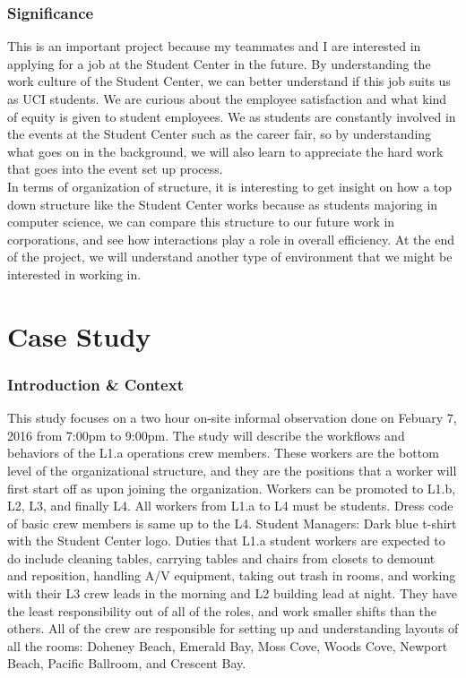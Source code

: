 \documentclass[letterpaper, 12pt]{report}
\begin{document}
\section{Significance}

This is an important project because my teammates and I are interested in applying for a job at the Student Center in the future. By understanding the work culture of the Student Center, we can better understand if this job suits us as UCI students. We are curious about the employee satisfaction and what kind of equity is given to student employees. We as students are constantly involved in the events at the Student Center such as the career fair, so by understanding what goes on in the background, we will also learn to appreciate the hard work that goes into the event set up process.\\

In terms of organization of structure, it is interesting to get insight on how a top down structure like the Student Center works because as students majoring in computer science, we can compare this structure to our future work in corporations, and see how interactions play a role in overall efficiency. At the end of the project, we will understand another type of environment that we might be interested in working in.


\part{Case Study}
\section{Introduction \& Context}
This study focuses on a two hour on-site informal observation done on Febuary 7, 2016 from 7:00pm to 9:00pm. The study will describe the workflows and behaviors of the L1.a operations crew members. These workers are the bottom level of the organizational structure, and they are the positions that a worker will first start off as upon joining the organization. Workers can be promoted to L1.b, L2, L3, and finally L4. All workers from L1.a to L4 must be students. Dress code of basic crew members is same up to the L4. Student Managers: Dark blue t-shirt with the Student Center logo. Duties that L1.a student workers are expected to do include cleaning tables, carrying tables and chairs from closets to demount and reposition, handling A/V equipment, taking out trash in rooms, and working with their L3 crew leads in the morning and L2 building lead at night. They have the least responsibility out of all of the roles, and work smaller shifts than the others. All of the crew are responsible for setting up and understanding layouts of all the rooms: Doheney Beach, Emerald Bay, Moss Cove, Woods Cove, Newport Beach, Pacific Ballroom, and Crescent Bay.\\
\end{document}
